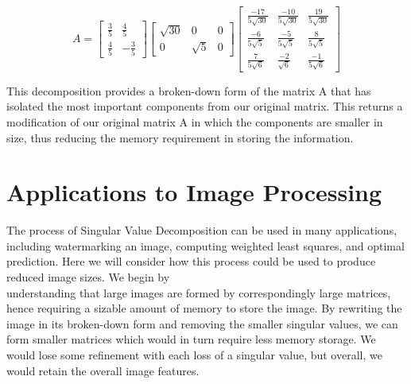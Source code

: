 \documentclass[10pt]{article}
\begin{document}
$$
A=\left[\begin{array}{cc}
\frac{3}{5} & \frac{4}{5} \\
\frac{4}{5} & -\frac{3}{5}
\end{array}\right]\left[\begin{array}{ccc}
\sqrt{30} & 0 & 0 \\
0 & \sqrt{5} & 0
\end{array}\right]\left[\begin{array}{ccc}
\frac{-17}{5 \sqrt{30}} & \frac{-10}{5 \sqrt{30}} & \frac{19}{5 \sqrt{30}} \\
\frac{-6}{5 \sqrt{5}} & \frac{-5}{5 \sqrt{5}} & \frac{8}{5 \sqrt{5}} \\
\frac{7}{5 \sqrt{6}} & \frac{-2}{\sqrt{6}} & \frac{-1}{5 \sqrt{6}}
\end{array}\right]
$$

This decomposition provides a broken-down form of the matrix A that has isolated the most important components from our original matrix. This returns a modification of our original matrix A in which the components are smaller in size, thus reducing the memory requirement in storing the information.

\section*{Applications to Image Processing}
The process of Singular Value Decomposition can be used in many applications, including watermarking an image, computing weighted least squares, and optimal prediction. Here we will consider how this process could be used to produce reduced image sizes. We begin by\\
understanding that large images are formed by correspondingly large matrices, hence requiring a sizable amount of memory to store the image. By rewriting the image in its broken-down form and removing the smaller singular values, we can form smaller matrices which would in turn require less memory storage. We would lose some refinement with each loss of a singular value, but overall, we would retain the overall image features.
\end{document}
